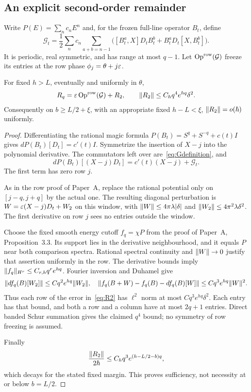 \subsection{An explicit second-order remainder}
Write $P(E)=\sum_nc_nE^n$ and, for the frozen full-line operator $B_t$, define
\begin{equation}\label{eq:Gdefinition}
 \mathcal G_t=\frac12\sum_nc_n\sum_{a+b=n-1}
 \bigl([B_t^a,X]D_tB_t^b+B_t^aD_t[X,B_t^b]\bigr).
\end{equation}
It is periodic, real symmetric, and has range at most $q-1$. Let $\operatorname{Op}^{\rm row}(\mathcal G)$ freeze its entries at the row phase $\phi_j=\theta+j\varepsilon$.

\begin{proposition}\label{prop:remainder}
For fixed $h>L$, eventually and uniformly in $\theta$,
\begin{equation}\label{eq:R2}
 R_q=\varepsilon\operatorname{Op}^{\rm row}(\mathcal G)+R_2,
 \qquad \lVert R_2\rVert\le C_hq^4e^{hq}\delta^2.
\end{equation}
Consequently on $b\ge L/2+\xi$, with an appropriate fixed $h-L<\xi$,
$\lVert R_2\rVert=o(\hbar)$ uniformly.
\end{proposition}
\begin{proof}
Differentiating the rational magic formula $P(B_t)=S^q+S^{-q}+c(t)I$ gives $dP(B_t)[D_t]=c'(t)I$. Symmetrize the insertion of $X-j$ into the polynomial derivative. The commutators left over are~\eqref{eq:Gdefinition}, and
\[
 dP(B_t)[(X-j)D_t]=c'(t)(X-j)+\mathcal G_t.
\]
The first term has zero row $j$.

As in the row proof of Paper~A, replace the rational potential only on $[j-q,j+q]$ by the actual one. The resulting diagonal perturbation is $W=\varepsilon(X-j)D_t+W_2$ on this window, with
$\lVert W\rVert\le4\pi\lambda|\delta|$ and $\lVert W_2\rVert\le4\pi^2\lambda\delta^2$. The first derivative on row $j$ sees no entries outside the window.

Choose the fixed smooth energy cutoff $f_q=\chi P$ from the proof of Paper~A, Proposition~3.3. Its support lies in the derivative neighbourhood, and it equals $P$ near both comparison spectra. Rational spectral continuity and $\lVert W\rVert\to0$ justify that assertion uniformly in the row. The derivative bounds imply $\lVert f_q\rVert_{H^r}\le C_{r,h}q^re^{hq}$. Fourier inversion and Duhamel give
\[
 \lVert df_q(B)[W_2]\rVert\le Cq^2e^{hq}\lVert W_2\rVert,\quad
 \lVert f_q(B+W)-f_q(B)-df_q(B)[W]\rVert
       \le Cq^3e^{hq}\lVert W\rVert^2.
\]
Thus each row of the error in~\eqref{eq:R2} has $\ell^2$ norm at most $Cq^3e^{hq}\delta^2$. Each entry has that bound, and both a row and a column have at most $2q+1$ entries. Direct banded Schur summation gives the claimed $q^4$ bound; no symmetry of row freezing is assumed.

Finally
\[
 \frac{\lVert R_2\rVert}{2\hbar}\le C_hq^3e^{(h-L/2-b)q},
\]
which decays for the stated fixed margin. This proves sufficiency, not necessity at or below $b=L/2$.
\end{proof}

